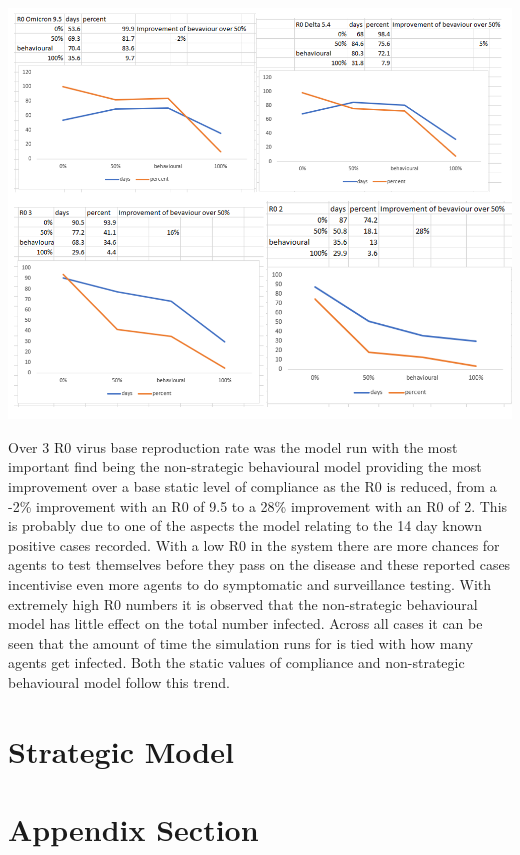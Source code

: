 \documentclass{article}
\begin{document}
\includegraphics[width=\textwidth]{basicgraph}


Over 3 R0 virus base reproduction rate was the model run with the most important find being the non-strategic behavioural model providing the most improvement over a base static level of compliance as the R0 is reduced, from a -2\% improvement with an R0 of 9.5 to a 28\% improvement with an R0 of 2. This is probably due to one of the aspects the model relating to the 14 day known positive cases recorded. With a low R0 in the system there are more chances for agents to test themselves before they pass on the disease and these reported cases incentivise even more agents to do symptomatic and surveillance testing. With extremely high R0 numbers it is observed that the non-strategic behavioural model has little effect on the total number infected. Across all cases it can be seen that the amount of time the simulation runs for is tied with how many agents get infected. Both the static values of compliance and non-strategic behavioural model follow this trend. 



\section{Strategic Model}


\newpage
\appendix

\section{Appendix Section}
\end{document}
